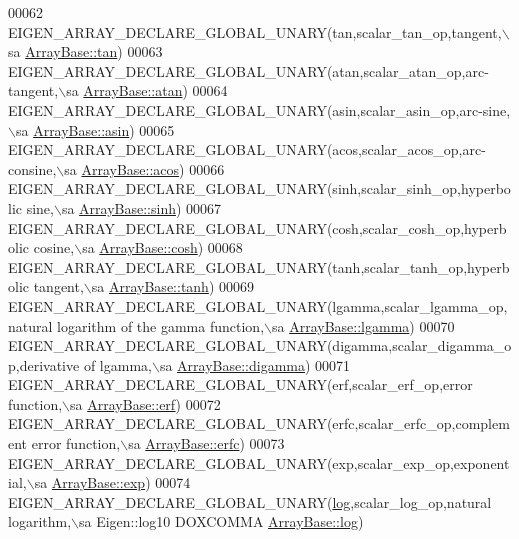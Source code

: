 \begin{DoxyCode}
00062   EIGEN\_ARRAY\_DECLARE\_GLOBAL\_UNARY(tan,scalar\_tan\_op,tangent,\(\backslash\)sa \hyperlink{group___core___module_acc502922cf9aeb43b07b30f250cd1d21}{ArrayBase::tan})
00063   EIGEN\_ARRAY\_DECLARE\_GLOBAL\_UNARY(atan,scalar\_atan\_op,arc-tangent,\(\backslash\)sa 
      \hyperlink{group___core___module_a3d7c83346563ef1abac3c75615959595}{ArrayBase::atan})
00064   EIGEN\_ARRAY\_DECLARE\_GLOBAL\_UNARY(asin,scalar\_asin\_op,arc-sine,\(\backslash\)sa 
      \hyperlink{group___core___module_a6d090b549b70fcb9468d16341c2204f2}{ArrayBase::asin})
00065   EIGEN\_ARRAY\_DECLARE\_GLOBAL\_UNARY(acos,scalar\_acos\_op,arc-consine,\(\backslash\)sa 
      \hyperlink{group___core___module_a823b8a01037260c26ea853f41a75dd87}{ArrayBase::acos})
00066   EIGEN\_ARRAY\_DECLARE\_GLOBAL\_UNARY(sinh,scalar\_sinh\_op,hyperbolic sine,\(\backslash\)sa 
      \hyperlink{group___core___module_a0984c5e3b76efa0c66a754ea7106f5b9}{ArrayBase::sinh})
00067   EIGEN\_ARRAY\_DECLARE\_GLOBAL\_UNARY(cosh,scalar\_cosh\_op,hyperbolic cosine,\(\backslash\)sa 
      \hyperlink{group___core___module_a5fd3dbcabcd2857db8f26ca5b321788f}{ArrayBase::cosh})
00068   EIGEN\_ARRAY\_DECLARE\_GLOBAL\_UNARY(tanh,scalar\_tanh\_op,hyperbolic tangent,\(\backslash\)sa 
      \hyperlink{group___core___module_a1e63179878d5a652fef566a67f5b4014}{ArrayBase::tanh})
00069   EIGEN\_ARRAY\_DECLARE\_GLOBAL\_UNARY(lgamma,scalar\_lgamma\_op,natural logarithm of the gamma \textcolor{keyword}{function},\(\backslash\)sa 
      \hyperlink{group___core___module_aaacc294090a265da0dc695737750dd28}{ArrayBase::lgamma})
00070   EIGEN\_ARRAY\_DECLARE\_GLOBAL\_UNARY(digamma,scalar\_digamma\_op,derivative of lgamma,\(\backslash\)sa 
      \hyperlink{group___core___module_a8fe3f90b672d2c4e80bf1c74b6b088e5}{ArrayBase::digamma})
00071   EIGEN\_ARRAY\_DECLARE\_GLOBAL\_UNARY(erf,scalar\_erf\_op,error \textcolor{keyword}{function},\(\backslash\)sa 
      \hyperlink{group___core___module_aa63d066102c083a96f0abec99a330f60}{ArrayBase::erf})
00072   EIGEN\_ARRAY\_DECLARE\_GLOBAL\_UNARY(erfc,scalar\_erfc\_op,complement error \textcolor{keyword}{function},\(\backslash\)sa 
      \hyperlink{group___core___module_a0b5dc4e2072be63b4920f7b88dc1bf83}{ArrayBase::erfc})
00073   EIGEN\_ARRAY\_DECLARE\_GLOBAL\_UNARY(exp,scalar\_exp\_op,exponential,\(\backslash\)sa 
      \hyperlink{group___core___module_a7b262ecb3e4db0f87d2eae85f2d64f15}{ArrayBase::exp})
00074   EIGEN\_ARRAY\_DECLARE\_GLOBAL\_UNARY(\hyperlink{structlog}{log},scalar\_log\_op,natural logarithm,\(\backslash\)sa Eigen::log10 DOXCOMMA 
      \hyperlink{group___core___module_a7748ba1f6891fa4e10723a8bf77b8770}{ArrayBase::log})

\end{DoxyCode}
